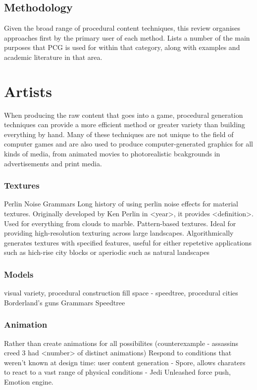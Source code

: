 \documentclass{./acm_proc_article-sp}
\begin{document}
\subsection{Methodology}
Given the broad range of procedural content techniques, this review organises approaches first by the primary user of each method. Lists a number of the main purposes that PCG is used for within that category, along with examples and academic literature in that area.


\section{Artists}
When producing the raw content that goes into a game, procedural generation techniques can provide a more efficient method or greater variety than building everything by hand. Many of these techniques are not unique to the field of computer games and are also used to produce computer-generated graphics for all kinds of media, from animated movies to photorealistic bcakgrounds in advertisements and print media.

\subsubsection{Textures}

Perlin Noise
Grammars
Long history of using perlin noise effects for material textures. Originally developed by Ken Perlin in <year>, it provides <definition>. Used for everything from clouds to marble.
Pattern-based textures. Ideal for providing high-resolution texturing across large landscapes. Algorithmically generates textures with specified features, useful for either repetetive applications such as hich-rise city blocks or aperiodic such as natural landscapes \cite{patternTextures}
\subsubsection{Models}
visual variety, procedural construction
fill space - speedtree\cite{speedtree}, procedural cities
Borderland's guns
Grammars
Speedtree
\subsubsection{Animation}
Rather than create animations for all possibilites (counterexample - assassins creed 3 had <number> of distinct animations)
Respond to conditions that weren't known at design time: user content generation - Spore\cite{Spore}, allows charaters to react to a vast range of physical conditions - Jedi Unleashed force push, Emotion engine.
\end{document}
